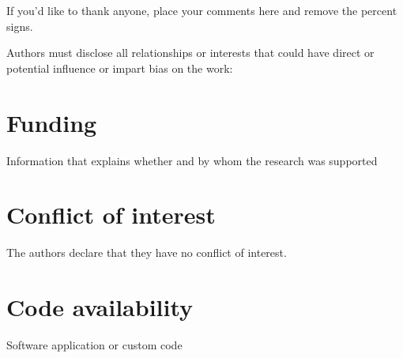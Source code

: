 

\begin{acknowledgements}
If you'd like to thank anyone, place your comments here and remove the percent signs.
\end{acknowledgements}


Authors must disclose all relationships or interests that could have direct or potential influence or impart bias on
 the work:

\section*{Funding}

Information that explains whether and by whom the research was supported

\section*{Conflict of interest}

The authors declare that they have no conflict of interest.

\section*{Code availability}

Software application or custom code

